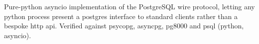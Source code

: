 Pure-python asyncio implementation of the PostgreSQL wire protocol, letting any python process present a postgres interface to standard clients rather than a bespoke http api. Verified against psycopg, asyncpg, pg8000 and psql (python, asyncio).

